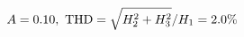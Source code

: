 \documentclass[preview]{standalone}
\begin{document}
\begin{align*}
\special{dvisvgm:raw <g id='unique000'>}A=0.10,\ \text{THD}=\sqrt{H_2^2+H_3^2}/H_1=2.0\%\special{dvisvgm:raw </g>}
\end{align*}
\end{document}
